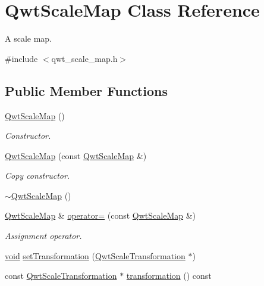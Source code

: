 \hypertarget{class_qwt_scale_map}{\section{Qwt\-Scale\-Map Class Reference}
\label{class_qwt_scale_map}
}


A scale map.  




{\ttfamily \#include $<$qwt\-\_\-scale\-\_\-map.\-h$>$}

\subsection*{Public Member Functions}
\begin{DoxyCompactItemize}
\item 
\hyperlink{class_qwt_scale_map_a9576a2e19c0be1d036fee344ab68f542}{Qwt\-Scale\-Map} ()
\begin{DoxyCompactList}\small\item\em Constructor. \end{DoxyCompactList}\item 
\hyperlink{class_qwt_scale_map_a579bc766106d98edd7153e62ea77a19b}{Qwt\-Scale\-Map} (const \hyperlink{class_qwt_scale_map}{Qwt\-Scale\-Map} \&)
\begin{DoxyCompactList}\small\item\em Copy constructor. \end{DoxyCompactList}\item 
\hyperlink{class_qwt_scale_map_aecafd09423984a5e0ffa935d1b45110c}{$\sim$\-Qwt\-Scale\-Map} ()
\item 
\hyperlink{class_qwt_scale_map}{Qwt\-Scale\-Map} \& \hyperlink{class_qwt_scale_map_a3f55ef14f8874e626380fcf92b096791}{operator=} (const \hyperlink{class_qwt_scale_map}{Qwt\-Scale\-Map} \&)
\begin{DoxyCompactList}\small\item\em Assignment operator. \end{DoxyCompactList}\item 
\hyperlink{group___u_a_v_objects_plugin_ga444cf2ff3f0ecbe028adce838d373f5c}{void} \hyperlink{class_qwt_scale_map_a37edc7ef45ce0958927f17ca96f91dde}{set\-Transformation} (\hyperlink{class_qwt_scale_transformation}{Qwt\-Scale\-Transformation} $\ast$)
\item 
const \hyperlink{class_qwt_scale_transformation}{Qwt\-Scale\-Transformation} $\ast$ \hyperlink{class_qwt_scale_map_a67bd65d38340ccf2c7e7623cf9bbc0e5}{transformation} () const 

\end{DoxyCompactItemize}
